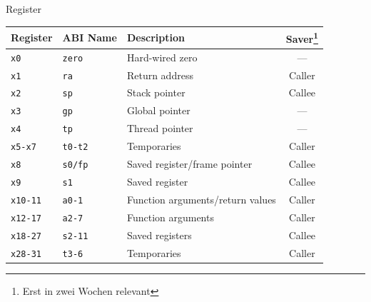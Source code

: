 \begin{frame}[c]{Register}{}
	\begin{center}
		{\rmfamily
			\begin{tabular}{|l|l|l|c|}
				\hline
				Register        & ABI Name       & Description                      & Saver\footnote{Erst in zwei Wochen relevant} \\ \hline
				\texttt{x0}     & \texttt{zero}  & Hard-wired zero                  & ---                                          \\
				\texttt{x1}     & \texttt{ra}    & Return address                   & Caller                                       \\
				\texttt{x2}     & \texttt{sp}    & Stack pointer                    & Callee                                       \\
				\texttt{x3}     & \texttt{gp}    & Global pointer                   & ---                                          \\
				\texttt{x4}     & \texttt{tp}    & Thread pointer                   & ---                                          \\
				\texttt{x5-x7}  & \texttt{t0-t2} & Temporaries                      & Caller                                       \\
				\texttt{x8}     & \texttt{s0/fp} & Saved register/frame pointer     & Callee                                       \\
				\texttt{x9}     & \texttt{s1}    & Saved register                   & Callee                                       \\
				\texttt{x10-11} & \texttt{a0-1}  & Function arguments/return values & Caller                                       \\
				\texttt{x12-17} & \texttt{a2-7}  & Function arguments               & Caller                                       \\
				\texttt{x18-27} & \texttt{s2-11} & Saved registers                  & Callee                                       \\
				\texttt{x28-31} & \texttt{t3-6}  & Temporaries                      & Caller                                       \\ \hline
			\end{tabular}
		}
	\end{center}
\end{frame}

